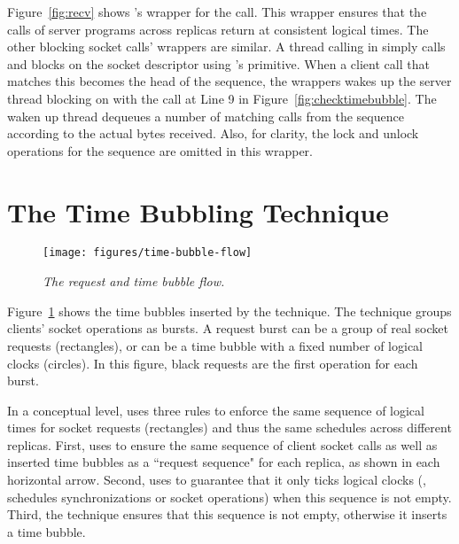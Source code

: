 Figure~\ref{fig:recv} shows \xxx's wrapper for the \recv call. This wrapper 
ensures that the \recv calls of server programs across replicas return at 
consistent logical times. The other blocking socket calls' wrappers are 
similar. A thread calling \recv in \xxx simply calls \getturn and blocks on the 
socket descriptor using \parrot's \wait primitive. When a client 
\send call that matches this \recv becomes the head of the \paxos sequence, 
the \mutexlock wrappers wakes up the server thread blocking on \recv with the
\signal call at Line 9 in Figure~\ref{fig:checktimebubble}. The waken up thread 
dequeues a number of matching \send calls from the \paxos sequence according to 
the actual bytes received. Also, for clarity, the lock and unlock operations for 
the \paxos sequence are omitted in this \recv wrapper.


\section{The Time Bubbling Technique} \label{sec:time-bubble}

\begin{figure}[t]
\centering
\texttt{[image: figures/time-bubble-flow]}
\vspace{-.40in}
\caption{{\em The request and time bubble flow.}} \label{fig:bubbleflow}
\vspace{-.05in}
\end{figure}

Figure~\ref{fig:bubbleflow} shows the time bubbles inserted by the \timealgo 
technique. The technique groups clients' socket operations as bursts. A request 
burst can be a group of real socket requests (rectangles), or can be a time 
bubble with a fixed number of logical clocks (circles). In this figure, black 
requests are the first operation for each burst.


In a conceptual level, \xxx uses three rules to enforce the same sequence of 
logical times for socket requests (rectangles) and thus the same schedules 
across different replicas. First, \xxx uses \paxos to ensure the same 
sequence of client socket calls as well as inserted time bubbles as a 
``\paxos request sequence" for each replica, as shown in each horizontal arrow. 
Second, \xxx uses \dmt to guarantee that it only ticks logical clocks (\ie, 
schedules \pthread synchronizations or socket operations) when this 
sequence is not empty. Third, the \timealgo technique ensures that this 
sequence is not empty, otherwise it inserts a time bubble.


